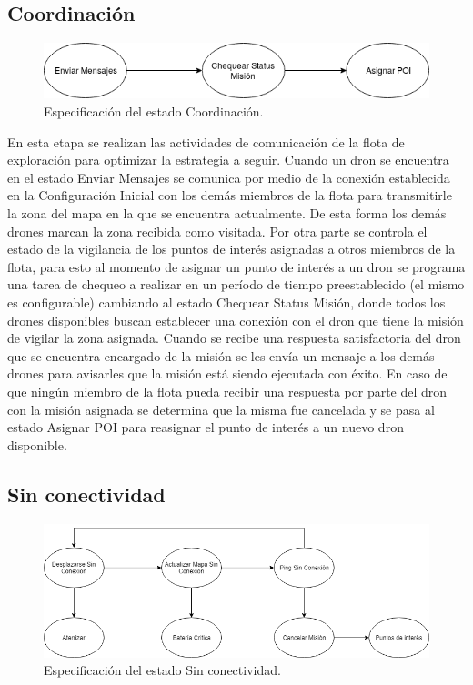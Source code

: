 \subsection {Coordinación}


\begin{figure}[h!]
	\label{fig:comp}
	\includegraphics[width=.8\textwidth]{imagenes/chap5/image6}
	\caption{Especificación del estado Coordinación.}
\end{figure}

En esta etapa se realizan las actividades de comunicación de la flota de exploración para optimizar la estrategia a seguir.
Cuando un dron se encuentra en el estado Enviar Mensajes se comunica por medio de la conexión establecida en la Configuración Inicial con los demás miembros de la flota para transmitirle la zona del mapa en la que se encuentra actualmente. De esta forma los demás drones marcan la zona recibida como visitada.
Por otra parte se controla el estado de la vigilancia de los puntos de interés asignadas a otros miembros de la flota, para esto al momento de asignar un punto de interés a un dron se programa una tarea de chequeo a realizar en un período de tiempo preestablecido (el mismo es configurable) cambiando al estado Chequear Status Misión, donde todos los drones disponibles buscan establecer una conexión con el dron que tiene la misión de vigilar la zona asignada. Cuando se recibe una respuesta satisfactoria del dron que se encuentra encargado de la misión se les envía un mensaje a los demás drones para avisarles que la misión está siendo ejecutada con éxito. En caso de que ningún miembro de la flota pueda recibir una respuesta por parte del dron con la misión asignada se determina que la misma fue cancelada y se pasa al estado Asignar POI para reasignar el punto de interés a un nuevo dron disponible.
\subsection {Sin conectividad}


\begin{figure}[h!]
	\label{fig:comp}
	\includegraphics[width=.8\textwidth]{imagenes/chap5/image7}
	\caption{Especificación del estado Sin conectividad.}
\end{figure}

